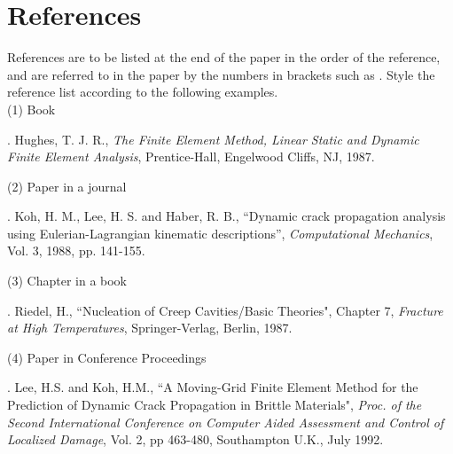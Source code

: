 \documentclass[12pt]{ksiamproc}
\begin{document}
	\section*{References}\noindent%
	References are to be listed at the end of the paper in the order
	of the reference, and are referred to in the paper by the numbers
	in brackets such as \cite{hugh,KLH}.  Style the reference list
	according to the following examples.
	\\
	
	\noindent (1) Book
	
	.  Hughes, T. J. R., {\it The Finite Element Method,
		Linear Static and Dynamic Finite Element  Analysis},
	Prentice-Hall, Engelwood Cliffs, NJ, 1987.
	
	\bigskip
	
	\noindent (2) Paper in a journal
	
	.  Koh, H. M., Lee, H. S. and Haber, R. B., ``Dynamic
	crack propagation analysis using Eulerian-Lagrangian kinematic
	descriptions'', {\it Computational Mechanics}, Vol. 3, 1988, pp.
	141-155.
	
	\bigskip
	\noindent (3) Chapter in a book
	
	.  Riedel, H., ``Nucleation of Creep Cavities/Basic
	Theories", Chapter 7, {\it Fracture at High Temperatures},
	Springer-Verlag, Berlin, 1987.
	
	\bigskip
	\noindent (4) Paper in Conference Proceedings
	
	.  Lee, H.S. and Koh, H.M., ``A Moving-Grid Finite
	Element Method for the Prediction of Dynamic Crack Propagation in
	Brittle Materials", {\it Proc. of the Second International
		Conference on Computer Aided Assessment and Control of Localized
		Damage}, Vol. 2, pp 463-480, Southampton U.K., July 1992.
	
\end{document}
